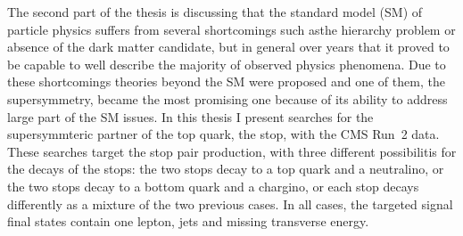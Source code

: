 





The second part of the thesis is discussing that the standard model (SM) of particle physics suffers from several shortcomings such asthe hierarchy problem or absence of the dark matter candidate, but in general over years that it proved to be capable to well describe the majority of observed physics phenomena. Due to these shortcomings theories beyond the SM were proposed and one of them, the supersymmetry, became the most promising one because of its ability to address large part of the SM issues. In this thesis I present searches for the supersymmteric partner of the top quark, the stop, with the CMS Run~2 data. These searches target the stop pair production, with three different possibilitis for the decays of the stops: the two stops decay to a top quark and a neutralino, or the two stops decay to a bottom quark and a chargino, or each stop decays differently as a mixture of the two previous cases. In all cases, the targeted signal final states contain one lepton, jets and missing transverse energy. 

